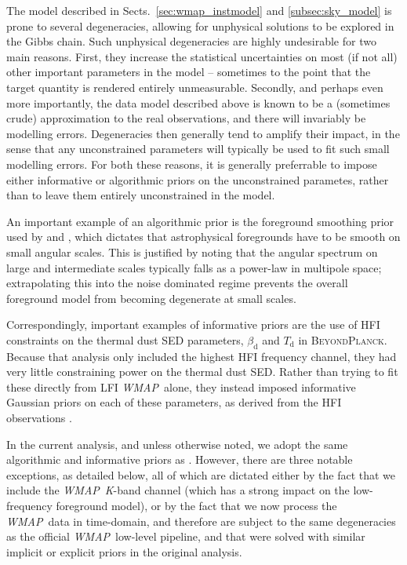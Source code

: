 \documentclass[twocolumn]{../../common/aa}
\def\WMAP{\emph{WMAP}}
\newcommand{\bp}{\textsc{BeyondPlanck}}
\newcommand{\K}[0]{\textit K}
\begin{document}
The model described in Sects.~\ref{sec:wmap_instmodel} and \ref{subsec:sky_model} is prone to several degeneracies, allowing for unphysical solutions to be explored in the Gibbs chain. Such unphysical degeneracies are highly undesirable for two main reasons. First, they increase the statistical uncertainties on most (if not all) other important parameters in the model -- sometimes to the point that the target quantity is rendered entirely unmeasurable. Secondly, and perhaps even more importantly, the data model described above is known to be a (sometimes crude) approximation to the real observations, and there will invariably be modelling errors. Degeneracies then generally tend to amplify their impact, in the sense that any unconstrained parameters will typically be used to fit such small modelling errors. For both these reasons, it is generally preferrable to impose either informative or algorithmic priors on the unconstrained parametes, rather than to leave them entirely unconstrained in the model.

An important example of an algorithmic prior is the foreground smoothing prior used by \citet{planck2016-l04} and \citet{bp13}, which dictates that astrophysical foregrounds have to be smooth on small angular scales. This is justified by noting that the angular spectrum on large and intermediate scales typically falls as a power-law in multipole space; extrapolating this into the noise dominated regime prevents the overall foreground model from becoming degenerate at small scales.

Correspondingly, important examples of informative priors are the use of HFI constraints on the thermal dust SED parameters, $\beta_{\mathrm{d}}$ and $T_{\mathrm{d}}$ in \bp. Because that analysis only included the highest HFI frequency channel, they had very little constraining power on the thermal dust SED. Rather than trying to fit these directly from LFI \WMAP\ alone, they instead imposed informative Gaussian priors on each of these parameters, as derived from the HFI observations \citep{planck2016-l04}.

In the current analysis, and unless otherwise noted, we adopt the same algorithmic and informative priors as \citet{bp01}. However, there are three notable exceptions, as detailed below, all of which are dictated either by the fact that we include the \WMAP\ \K-band channel (which has a strong impact on the low-frequency foreground model), or by the fact that we now process the \WMAP\ data in time-domain, and therefore are subject to the same degeneracies as the official \WMAP\ low-level pipeline, and that were solved with similar implicit or explicit priors in the original analysis.
\end{document}
